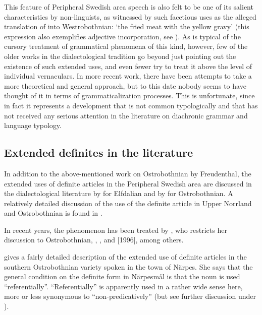 	\z
\z
	

This feature of Peripheral Swedish area speech is also felt to be one of its salient characteristics by non-linguists, as witnessed by such facetious uses as the alleged translation of into Westrobothnian:  ‘the fried meat with the yellow gravy’ (this expression also exemplifies adjective incorporation, see ). As is typical of the cursory treatment of grammatical phenomena of this kind, however, few of the older works in the dialectological tradition go beyond just pointing out the existence of such extended uses, and even fewer try to treat it above the level of individual vernaculars. In more recent work, there have been attempts to take a more theoretical and general approach, but to this date nobody seems to have thought of it in terms of grammaticalization processes. This is unfortunate, since in fact it represents a development that is not common typologically and that has not received any serious attention in the literature on diachronic grammar and language typology.

\subsection{ Extended definites in the literature}

In addition to the above-mentioned work on Ostrobothnian by Freudenthal, the extended uses of definite articles in the Peripheral Swedish area are discussed in the dialectological literature by \citet{Levander1909} for Elfdalian and by \citet{Hummelstedt1934} for Ostrobothnian. A relatively detailed discussion of the use of the definite article in Upper Norrland and Ostrobothnian is found in \citet[281ff]{ÅgrenEtAl1954}. 

In recent years, the phenomenon has been treated by \citet{Nikula1997}, who restricts her discussion to Ostrobothnian, \citet{Delsing1993}, \citet{Delsing2003b}, and \citet{HolmbergEtAl2003} [1996], among others.

\citet{Nikula1997} gives a fairly detailed description of the extended use of definite articles in the southern Ostrobothnian variety spoken in the town of Närpes. She says that the general condition on the definite form in Närpesmål is that the noun is used “referentially”. “Referentially” is apparently used in a rather wide sense here, more or less synonymous to “non-predicatively” (but see further discussion under ). 

